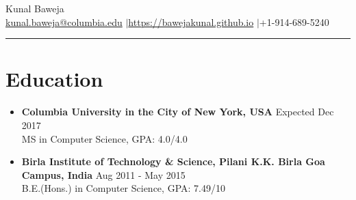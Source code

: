 \documentclass{article}
\def\name{Kunal Baweja}
\begin{document}
\begin{center}
{\huge \name}\\
\href{mailto:kunal.baweja@columbia.edu}{kunal.baweja@columbia.edu} $|$\hspace{3pt}\href{https://bawejakunal.github.io}{https://bawejakunal.github.io} $|$\hspace{3pt}+1-914-689-5240
\end{center}

\hrule
\vspace{5pt}

\section*{Education}
\begin{itemize}

    \item \textbf{Columbia University in the City of New York, USA} {\hfill Expected Dec 2017}\\
    MS in Computer Science, GPA: 4.0/4.0
    
    \item \textbf{Birla Institute of Technology \& Science, Pilani K.K. Birla Goa Campus, India} {\hfill Aug 2011 - May 2015}\\
    B.E.(Hons.) in Computer Science, GPA: 7.49/10

\end{itemize}
\end{document}

